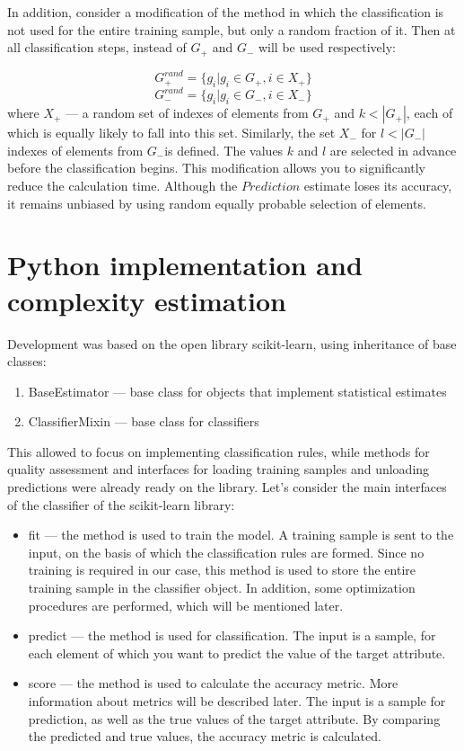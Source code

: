 \documentclass{article}
\begin{document}
In addition, consider a modification of the method in which the classification is not used for the entire training sample, but only a random fraction of it. Then at all classification steps, instead of $G_+$ and $G_-$ will be used respectively:

$$G_+^{rand} = \{ g_i | g_i \in G_+, i \in X_+\}$$
$$G_-^{rand} = \{ g_i | g_i \in G_-, i \in X_-\}$$
where $X_+$ --- a random set of indexes of elements from $G_+$ and $k < |G_+|$, each of which is equally likely to fall into this set. Similarly, the set $X_-$ for $l < |G_-|$ indexes of elements from $G_-$is defined. The values $k$ and $l$ are selected in advance before the classification begins. This modification allows you to significantly reduce the calculation time. Although the $Prediction$ estimate loses its accuracy, it remains unbiased by using random equally probable selection of elements.

\section{Python implementation and complexity estimation}

Development was based on the open library scikit-learn, using inheritance of base classes:

\begin{enumerate}
    \item BaseEstimator --- base class for objects that implement statistical estimates
    \item ClassifierMixin --- base class for classifiers
\end{enumerate}

This allowed to focus on implementing classification rules, while methods for quality assessment and interfaces for loading training samples and unloading predictions were already ready on the library. Let's consider the main interfaces of the classifier of the scikit-learn library:

\begin{itemize}
    \item fit --- the method is used to train the model. A training sample is sent to the input, on the basis of which the classification rules are formed. Since no training is required in our case, this method is used to store the entire training sample in the classifier object. In addition, some optimization procedures are performed, which will be mentioned later.
    \item predict --- the method is used for classification. The input is a sample, for each element of which you want to predict the value of the target attribute.
    \item score --- the method is used to calculate the accuracy metric.  More information about metrics will be described later. The input is a sample for prediction, as well as the true values of the target attribute. By comparing the predicted and true values, the accuracy metric is calculated.
\end{itemize}
\end{document}
